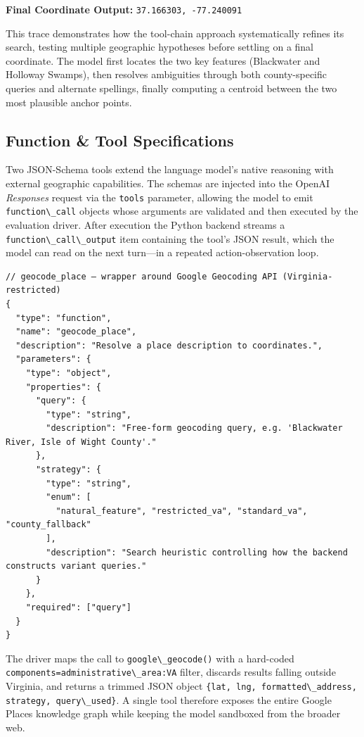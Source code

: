 \textbf{Final Coordinate Output:}
\passthrough{\lstinline!37.166303, -77.240091!}

This trace demonstrates how the tool-chain approach systematically
refines its search, testing multiple geographic hypotheses before
settling on a final coordinate. The model first locates the two key
features (Blackwater and Holloway Swamps), then resolves ambiguities
through both county-specific queries and alternate spellings, finally
computing a centroid between the two most plausible anchor points.

\subsection{Function \& Tool
Specifications}\label{a.4-function-tool-specifications}

Two JSON-Schema tools extend the language model's native reasoning with
external geographic capabilities. The schemas are injected into the
OpenAI \emph{Responses} request via the \passthrough{\lstinline!tools!}
parameter, allowing the model to emit
\passthrough{\lstinline!function\_call!} objects whose arguments are
validated and then executed by the evaluation driver. After execution
the Python backend streams a
\passthrough{\lstinline!function\_call\_output!} item containing the
tool's JSON result, which the model can read on the next turn---in a
repeated action-observation loop.

\begin{lstlisting}
// geocode_place – wrapper around Google Geocoding API (Virginia-restricted)
{
  "type": "function",
  "name": "geocode_place",
  "description": "Resolve a place description to coordinates.",
  "parameters": {
    "type": "object",
    "properties": {
      "query": {
        "type": "string",
        "description": "Free-form geocoding query, e.g. 'Blackwater River, Isle of Wight County'."
      },
      "strategy": {
        "type": "string",
        "enum": [
          "natural_feature", "restricted_va", "standard_va", "county_fallback"
        ],
        "description": "Search heuristic controlling how the backend constructs variant queries."
      }
    },
    "required": ["query"]
  }
}
\end{lstlisting}

The driver maps the call to \passthrough{\lstinline!google\_geocode()!}
with a hard-coded
\passthrough{\lstinline!components=administrative\_area:VA!} filter,
discards results falling outside Virginia, and returns a trimmed JSON
object
\passthrough{\lstinline!\{lat, lng, formatted\_address, strategy, query\_used\}!}.
A single tool therefore exposes the entire Google Places knowledge graph
while keeping the model sandboxed from the broader web.

